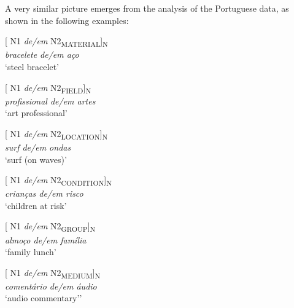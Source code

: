 \documentclass[output=paper]{langsci/langscibook}
\begin{document}
A very similar picture emerges from the analysis of the Portuguese data, as shown in the following examples:

\begin{exe}\ex\begin{minipage}[t]{0.4\textwidth}    %
[ N1 \textit{de/em} N2\textsubscript{MATERIAL}]\textsubscript{N}\\
\textit{bracelete de/em aço}\\
`steel bracelet'
\end{minipage}\hfill%
\begin{minipage}[t]{0.45\textwidth}
[ N1 \textit{de/em} N2\textsubscript{FIELD}]\textsubscript{N}\\
\textit{profissional de/em artes}\\
`art professional'
\end{minipage}
\end{exe}

\begin{exe}\ex\begin{minipage}[t]{0.4\textwidth}    %
[ N1 \textit{de/em} N2\textsubscript{LOCATION}]\textsubscript{N}\\
\textit{surf de/em ondas }\\
`surf (on waves)'
\end{minipage}\hfill            %
\begin{minipage}[t]{0.45\textwidth}
[ N1 \textit{de/em} N2\textsubscript{CONDITION}]\textsubscript{N}\\
\textit{crianças de/em risco}\\
`children at risk'
\end{minipage}\end{exe}

\begin{exe}\ex\begin{minipage}[t]{0.4\textwidth}    %
[ N1 \textit{de/em} N2\textsubscript{GROUP}]\textsubscript{N}\\
\textit{almoço de/em família}\\
`family lunch'
\end{minipage}\hfill%
\begin{minipage}[t]{0.45\textwidth}
[ N1 \textit{de/em} N2\textsubscript{MEDIUM}]\textsubscript{N}\\
\textit{comentário de/em áudio}\\
`audio commentary’'
\end{minipage}\end{exe}
\end{document}
